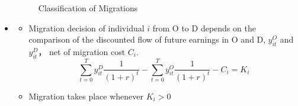 \begin{itemize}
\begin{figure}[H]
                \caption{Classification of Migrations}
            \end{figure}
    \item {}
    \begin{itemize}
        \item Migration decision of individual $i$ from O to D depends on the comparison of the discounted flow of future earnings in O and D, $y_{it}^O$ and $y_{it}^D$， net of migration cost $C_i$.
        $$ \sum_{t=0}^{T} y_{it}^D \frac{1}{{(1+r)}^t} - \sum_{t=0}^{T} y_{it}^O \frac{1}{{(1+r)}^t} - C_i = K_i $$

        \item Migration takes place whenever $K_i>0$
        \end{itemize}
    \end{itemize}

